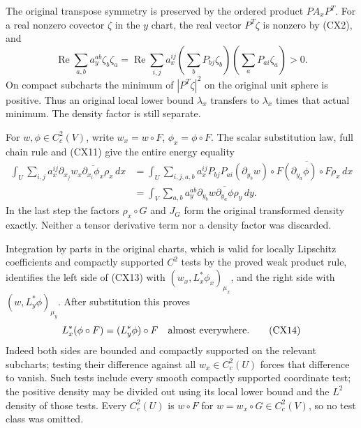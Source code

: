 \documentclass[
  11pt,
]{article}
\begin{document}
The original transpose symmetry is preserved by the ordered product
\(P A_xP^T\). For a real nonzero covector \(\zeta\) in the \(y\) chart,
the real vector \(P^T\zeta\) is nonzero by (CX2), and \[
 \operatorname{Re}\sum_{a,b}a_y^{ab}\zeta_b\zeta_a
 =\operatorname{Re}\sum_{i,j}
        a_x^{ij}\left(\sum_bP_{bj}\zeta_b\right)
                   \left(\sum_aP_{ai}\zeta_a\right)>0 .          \tag{CX12}
\] On compact subcharts the minimum of \(|P^T\zeta|^2\) on the original
unit sphere is positive. Thus an original local lower bound
\(\lambda_x\) transfers to \(\lambda_x\) times that actual minimum. The
density factor is still separate.

For \(w,\phi\in C_c^2(V)\), write \(w_x=w\circ F\),
\(\phi_x=\phi\circ F\). The scalar substitution law, full chain rule and
(CX11) give the entire energy equality \[
 \begin{split}
 \int_U\sum_{i,j}a_x^{ij}\partial_{x_j}w_x
                         \overline{\partial_{x_i}\phi_x}\rho_x\,dx
 &=\int_U\sum_{i,j,a,b}
    a_x^{ij}P_{bj}P_{ai}
       (\partial_{y_b}w)\circ F
       \overline{(\partial_{y_a}\phi)\circ F}\rho_x\,dx\\
 &=\int_V\sum_{a,b}a_y^{ab}\partial_{y_b}w
                         \overline{\partial_{y_a}\phi}\rho_y\,dy .
 \end{split}                                                   \tag{CX13}
\] In the last step the factors \(\rho_x\circ G\) and \(J_G\) form the
original transformed density exactly. Neither a tensor derivative term
nor a density factor was discarded.

Integration by parts in the original charts, which is valid for locally
Lipschitz coefficients and compactly supported \(C^2\) tests by the
proved weak product rule, identifies the left side of (CX13) with
\((w_x,L_x^*\phi_x)_{\mu_x}\), and the right side with
\((w,L_y^*\phi)_{\mu_y}\). After substitution this proves \[
                 L_x^*(\phi\circ F)=(L_y^*\phi)\circ F
                     \quad\hbox{almost everywhere}.             \tag{CX14}
\] Indeed both sides are bounded and compactly supported on the relevant
subcharts; testing their difference against all \(w_x\in C_c^2(U)\)
forces that difference to vanish. Such tests include every smooth
compactly supported coordinate test; the positive density may be divided
out using its local lower bound and the \(L^2\) density of those tests.
Every \(C_c^2(U)\) is \(w\circ F\) for \(w=w_x\circ G\in C_c^2(V)\), so
no test class was omitted.
\end{document}
